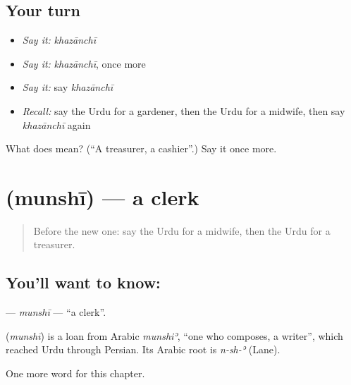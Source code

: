 \subsection*{Your turn}
\begin{itemize}
\raggedright
  \item \emph{Say it:} \emph{khazānchī}
  \item \emph{Say it:} \emph{khazānchī}, once more
  \item \emph{Say it:} say \emph{khazānchī}
  \item \emph{Recall:} say the Urdu for a gardener, then the Urdu for a midwife, then say \emph{khazānchī} again
\end{itemize}

\begin{tcolorbox}[breakable,colback=teal!4,colframe=teal!35!black,title={Before you move on}]
What does  mean? (\textquotedblleft{}A treasurer, a cashier\textquotedblright{}.) Say it once more.
\end{tcolorbox}
\section[\texorpdfstring{\ur{منشی} (munshī)}{منشی (munshī)}]{ (munshī) — a clerk}

\label{lesson:UR-C179-munshi}



\begin{quote}
Before the new one: say the Urdu for a midwife, then the Urdu for a treasurer.
\end{quote}

\subsection*{You'll want to know: }
\textbf{} — \emph{munshī} — \textquotedblleft{}a clerk\textquotedblright{}.

\begin{cousinweb}
\textbf{} (\emph{munshī}) is a loan from Arabic \emph{munshiʾ}, \textquotedblleft{}one who composes, a writer\textquotedblright{}, which reached Urdu through Persian. Its Arabic root is \emph{n-sh-ʾ} (Lane).
\end{cousinweb}

\begin{grammarlens}[title={What you've built}]
One more word for this chapter.
\end{grammarlens}

